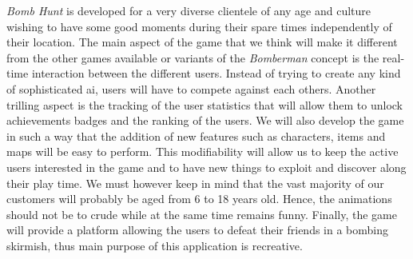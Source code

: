 \textit{Bomb Hunt} is developed for a very diverse clientele of any age and culture wishing to have some good moments during their spare times independently of their location. The main aspect of the game that we think will make it different from the other games available or variants of the \textit{Bomberman} concept is the real-time interaction between the different users. Instead of trying to create any kind of sophisticated \gls{ai}, users will have to compete against each others. Another trilling aspect is the tracking of the user statistics that will allow them to unlock achievements badges and the ranking of the users. We will also develop the game in such a way that the addition of new features such as characters, items and maps will be easy to perform. This modifiability will allow us to keep the active users interested in the game and to have new things to exploit and discover along their play time. We must however keep in mind that the vast majority of our customers will probably be aged from 6 to 18 years old. Hence, the animations should not be to crude while at the same time remains funny. Finally, the game will provide a platform allowing the users to defeat their friends in a bombing skirmish, thus main purpose of this application is recreative.
